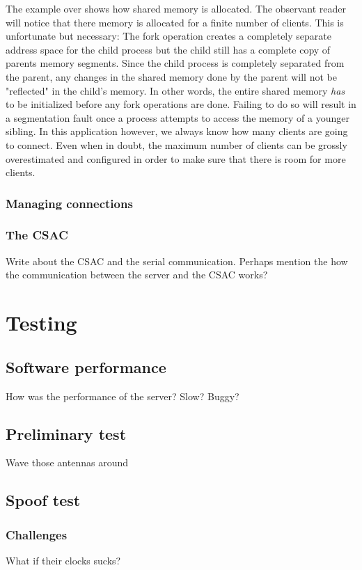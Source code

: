 \documentclass[12pt,english,a4paper]{report}
\begin{document}
The example over shows how shared memory is allocated. The observant reader will notice that there memory is allocated for a finite number of clients. This is unfortunate but necessary: The fork operation creates a completely separate address space for the child process but the child still has a complete copy of parents memory segments. Since the child process is completely separated from the parent, any changes in the shared memory done by the parent will not be "reflected" in the child's memory. In other words, the entire shared memory \textit{has} to be initialized before any fork operations are done. Failing to do so will result in a segmentation fault once a process attempts to access the memory of a younger sibling. In this application however, we always know how many clients are going to connect. Even when in doubt, the maximum number of clients can be grossly overestimated and configured in order to make sure that there is room for more clients.

\subsection{Managing connections}

\subsection{The CSAC}
Write about the CSAC and the serial communication. Perhaps mention the how the communication between the server and the CSAC works?

\chapter{Testing}

\section{Software performance}
How was the performance of the server? Slow? Buggy?

\section{Preliminary test}
Wave those antennas around

\section{Spoof test}
\subsection{Challenges}
What if their clocks sucks?
\end{document}
